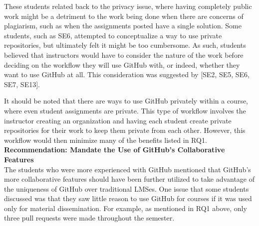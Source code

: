 
These students related back to the privacy issue, where having completely public work might be a detriment to the work being done when there are concerns of plagiarism, such as when the assignments posted have a single solution. Some students, such as SE6, attempted to conceptualize a way to use private repositories, but ultimately felt it might be too cumbersome. As such, students believed that instructors would have to consider the nature of the work before deciding on the workflow they will use GitHub with, or indeed, whether they want to use GitHub at all. This consideration was suggested by [SE2, SE5, SE6, SE7, SE13].

It should be noted that there are ways to use GitHub privately within a course, where even student assignments are private. This type of workflow involves the instructor creating an organization and having each student create private repositories for their work to keep them private from each other. However, this workflow would then minimize many of the benefits listed in RQ1. \\


\textbf{Recommendation: Mandate the Use of GitHub's Collaborative Features} \\
The students who were more experienced with GitHub mentioned that GitHub's more collaborative features should have been further utilized to take advantage of the uniqueness of GitHub over traditional LMSes. One issue that some students discussed was that they saw little reason to use GitHub for courses if it was used only for material dissemination. For example, as mentioned in RQ1 above, only three pull requests were made throughout the semester.

